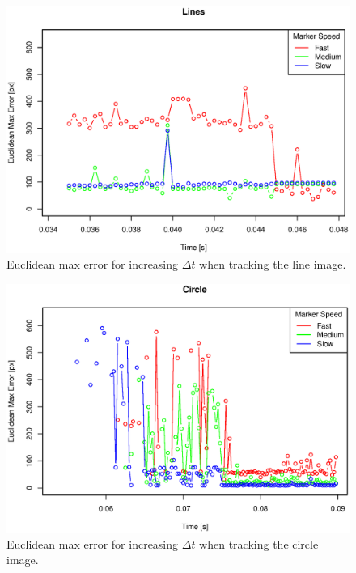 \begin{figure}[H]
\centering
\includegraphics[width= \fullImageWidth]{graphics/robotics/trackingerror_lines}
\caption{Euclidean max error for increasing $\Delta t$ when tracking the line image.}
\label{fig:trackingerror_lines}
\end{figure}

\begin{figure}[H]
\centering
\includegraphics[width= \fullImageWidth]{graphics/robotics/trackingerror_circle}
\caption{Euclidean max error for increasing $\Delta t$ when tracking the circle image.}
\label{fig:trackingerror_circle}
\end{figure}

